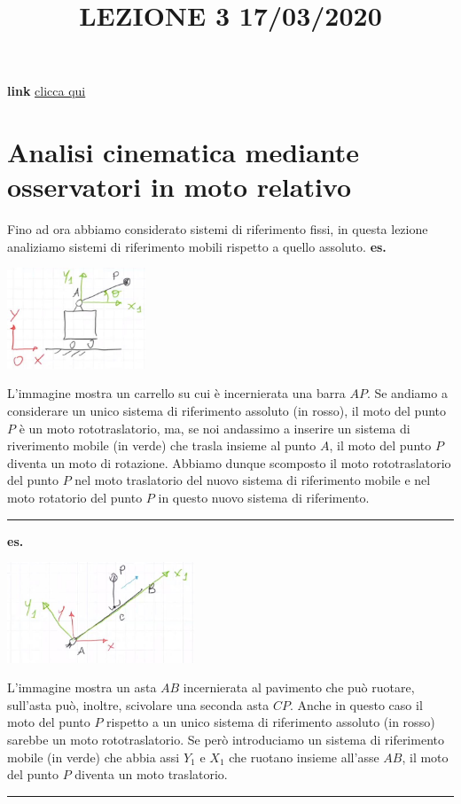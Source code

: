 \title{LEZIONE 3 17/03/2020}\newline
\textbf{link} \href{https://web.microsoftstream.com/video/b53b704d-3613-4728-9d95-917284509b0f}{clicca qui}
\section{Analisi cinematica mediante osservatori in moto relativo}
Fino ad ora abbiamo considerato sistemi di riferimento fissi, in questa lezione analiziamo sistemi di riferimento mobili rispetto a quello assoluto.\newline
\newline
\textbf{es.}
\begin{center}
    \includegraphics[height=3cm]{../lezione3/img1.JPG}
\end{center} 
L'immagine mostra un carrello su cui è incernierata una barra $AP$. Se andiamo a considerare un unico sistema di riferimento assoluto (in rosso), il moto del punto $P$ è un moto rototraslatorio, ma, se noi andassimo a inserire un sistema di riverimento mobile (in verde) che trasla insieme al punto $A$, il moto del punto $P$ diventa un moto di rotazione. Abbiamo dunque scomposto il moto rototraslatorio del punto $P$ nel moto traslatorio del nuovo sistema di riferimento mobile e nel moto rotatorio del punto $P$ in questo nuovo sistema di riferimento.\newline
\rule{\textwidth}{0,4pt}
\newline
\textbf{es.}
\begin{center}
    \includegraphics[height=3cm]{../lezione3/img2.JPG}
\end{center}
L'immagine mostra un asta $AB$ incernierata al pavimento che può ruotare, sull'asta può, inoltre, scivolare una seconda asta $CP$. Anche in questo caso il moto del punto $P$ rispetto a un unico sistema di riferimento assoluto (in rosso) sarebbe un moto rototraslatorio. Se però introduciamo un sistema di riferimento mobile (in verde) che abbia assi $Y_1$ e $X_1$ che ruotano insieme all'asse $AB$, il moto del punto $P$ diventa un moto traslatorio.\newline
\rule{\textwidth}{0,4pt}
